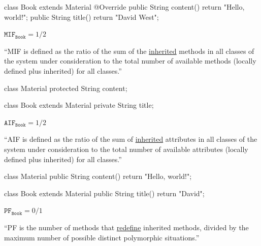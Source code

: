 \documentclass{article}
\begin{document}
\begin{multicols}{2}
{\small\begin{ffcode}
class Book extends Material {
  @Override
  public String content() {
    return "Hello, world!";
  }
  public String title() {
    return "David West";
  }
}
\end{ffcode}
}
\par\columnbreak\par
\(\texttt{MIF}_\texttt{Book} = 1/2\)\par
``MIF is defined as the ratio of the sum of the \ul{inherited} methods in all classes of
the system under consideration to the total number of available methods
(locally defined plus inherited) for all classes.''
\end{multicols}
\plush{}

\begin{multicols}{2}
{\small\begin{ffcode}
class Material {
  protected String content;
}

class Book extends Material {
  private String title;
}
\end{ffcode}
}
\par\columnbreak\par
\(\texttt{AIF}_\texttt{Book} = 1/2\)\par
``AIF is defined as the ratio of the sum of \ul{inherited} attributes in all classes of
the system under consideration to the total number of available attributes
(locally defined plus inherited) for all classes.''
\end{multicols}
\plush{}

\begin{multicols}{2}
{\small\begin{ffcode}
class Material {
  public String content() {
    return "Hello, world!";
  }
}

class Book extends Material {
  public String title() {
    return "David";
  }
}
\end{ffcode}
}
\par\columnbreak\par
\(\texttt{PF}_\texttt{Book} = 0/1\)\par
``PF is the number of methods that \ul{redefine} inherited methods, divided by the
maximum number of possible distinct polymorphic situations.''
\end{multicols}
\plush{}
\end{document}
